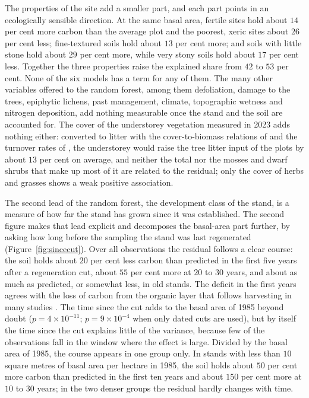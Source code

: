 \documentclass[11pt]{article}
\begin{document}
The properties of the site add a smaller part, and each part points in an ecologically
sensible direction. At the same basal area, fertile sites hold about $14$ per cent more
carbon than the average plot and the poorest, xeric sites about $26$ per cent less;
fine-textured soils hold about $13$ per cent more; and soils with little stone hold
about $29$ per cent more, while very stony soils hold about $17$ per cent less. Together
the three properties raise the explained share from $42$ to $53$ per cent. None of the
six models has a term for any of them. The many other variables offered to the random
forest, among them defoliation, damage to the trees, epiphytic lichens, past management,
climate, topographic wetness and nitrogen deposition, add nothing measurable once the
stand and the soil are accounted for. The cover of the understorey vegetation measured
in 2023 adds nothing either: converted to litter with the cover-to-biomass relations of
\citet{Muukkonen2006cover} and the turnover rates of \citet{Liski2006}, the understorey
would raise the tree litter input of the plots by about $13$ per cent on average, and
neither the total nor the mosses and dwarf shrubs that make up most of it are related
to the residual; only the cover of herbs and grasses shows a weak positive association.

The second lead of the random forest, the development class of the stand, is a measure
of how far the stand has grown since it was established. The second figure makes that
lead explicit and decomposes the basal-area part further, by asking how long before the
sampling the stand was last regenerated (Figure~\ref{fig:sincecut}). Over all
observations the residual follows a clear course: the soil holds about $20$ per cent
less carbon than predicted in the first five years after a regeneration cut, about
$55$ per cent more at $20$ to $30$ years, and about as much as predicted, or somewhat
less, in old stands. The deficit in the first years agrees with the loss of carbon from
the organic layer that follows harvesting in many studies \citep{JamesHarrison2016}.
The time since the cut adds to the basal area of 1985 beyond
doubt ($p = 4\times10^{-11}$; $p = 9\times10^{-4}$ when only dated cuts are used), but
by itself the time since the cut explains little of the variance, because few of the
observations fall in the window where the effect is large. Divided by the basal area of
1985, the course appears in one group only. In stands with less than $10$ square
metres of basal area per hectare in 1985, the soil holds about $50$ per cent more carbon
than predicted in the first ten years and about $150$ per cent more at $10$ to $30$
years; in the two denser groups the residual hardly changes with time.
\end{document}
